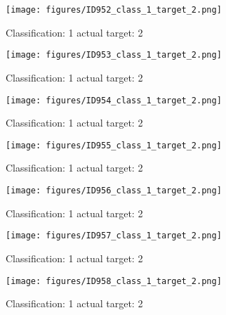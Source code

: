 \begin{figure}[h!]
\begin{center}
\texttt{[image: figures/ID952\_class\_1\_target\_2.png]}
\end{center}
\caption{ Classification: 1 actual target: 2}
\label{fig:ID952_class_1_target_2}
\end{figure}
\begin{figure}[h!]
\begin{center}
\texttt{[image: figures/ID953\_class\_1\_target\_2.png]}
\end{center}
\caption{ Classification: 1 actual target: 2}
\label{fig:ID953_class_1_target_2}
\end{figure}
\begin{figure}[h!]
\begin{center}
\texttt{[image: figures/ID954\_class\_1\_target\_2.png]}
\end{center}
\caption{ Classification: 1 actual target: 2}
\label{fig:ID954_class_1_target_2}
\end{figure}
\begin{figure}[h!]
\begin{center}
\texttt{[image: figures/ID955\_class\_1\_target\_2.png]}
\end{center}
\caption{ Classification: 1 actual target: 2}
\label{fig:ID955_class_1_target_2}
\end{figure}
\begin{figure}[h!]
\begin{center}
\texttt{[image: figures/ID956\_class\_1\_target\_2.png]}
\end{center}
\caption{ Classification: 1 actual target: 2}
\label{fig:ID956_class_1_target_2}
\end{figure}
\begin{figure}[h!]
\begin{center}
\texttt{[image: figures/ID957\_class\_1\_target\_2.png]}
\end{center}
\caption{ Classification: 1 actual target: 2}
\label{fig:ID957_class_1_target_2}
\end{figure}
\begin{figure}[h!]
\begin{center}
\texttt{[image: figures/ID958\_class\_1\_target\_2.png]}
\end{center}
\caption{ Classification: 1 actual target: 2}
\label{fig:ID958_class_1_target_2}
\end{figure}
